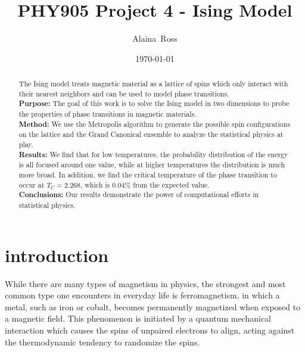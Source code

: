 \documentclass[prc,amsmath,twocolumn,superscriptaddress]{revtex4}
\begin{document}
  \newcommand {\nc} {\newcommand}
  \nc {\Sec} [1] {Sec.~\ref{#1}}
  \nc {\IR} [1] {\textcolor{red}{#1}} 

\title{PHY905 Project 4 - Ising Model}


\author{Alaina~Ross}

\date{\today}


\begin{abstract}
  The Ising model treats magnetic material as a lattice of spins which only interact with their nearest neighbors and can be used to model phase transitions.
\\ {\bf Purpose:} The goal of this work is to solve the Ising model in two dimensions to probe the properties of phase transitions in magnetic materials.
\\ {\bf Method:} We use the Metropolis algorithm to generate the possible spin configurations on the lattice and the Grand Canonical ensemble to analyze the statistical physics at play.
\\ {\bf Results:} We find that for low temperatures, the probability distribution of the energy is all focused around one value, while at higher temperatures the distribution is much more broad. In addition, we find the critical temperature of the phase transition to occur at $T_C=2.268$, which is 0.04\% from the expected value.
 \\ {\bf Conclusions:} Our results demonstrate the power of computational efforts in statistical physics.
\end{abstract}


\maketitle

\section{introduction}
\label{intro}
While there are many types of magnetism in physics, the strongest and most common type one encounters in everyday life is ferromagnetism, in which a metal, such as iron or cobalt, becomes permanently magnetized when exposed to a magnetic field. This phenomenon is initiated by a quantum mechanical interaction which causes the spins of unpaired electrons to align, acting against the thermodynamic tendency to randomize the spins.
\end{document}
